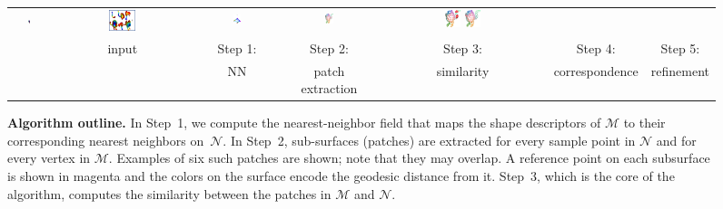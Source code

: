 \begin{figure}[htb]
\begin{tabular}{ccccccc}
		\includegraphics[width=0.08\textwidth]{figures/NNFin.png} &
		\includegraphics[width=0.2\textwidth]{figures/PartPatches.png} &
		\includegraphics[width=0.1\textwidth]{figures/DDISdown.png} &
		\includegraphics[width=0.1\textwidth]{figures/CorrsInit.png} &
		\includegraphics[width=0.1\textwidth]{figures/CorrsOutlier.png}
		\includegraphics[width=0.1\textwidth]{figures/CorrsRefine.png}\\
		&input &
		Step 1: &
		Step 2:  &
		Step 3:  &
		Step 4:  &
		Step 5: 
		\\
		& &
		 NN &
		 patch extraction &
		 similarity &
		 correspondence &
		 refinement
	\end{tabular}
	\caption{{\textbf {Algorithm outline.}}
    In Step~1, we compute the nearest-neighbor field that maps the shape descriptors of $\mathcal{M}$ to their corresponding nearest neighbors on~$\mathcal{N}$.
In Step~2, sub-surfaces (patches) are extracted for every sample point in $\mathcal{N}$ and for every vertex in $\mathcal{M}$.
Examples of six such patches are shown; note that they may overlap.
A reference point on each subsurface is shown in magenta and the colors on the surface encode the geodesic distance from it.
Step~3, which is the core of the algorithm, computes the similarity between the patches in $\mathcal{M}$ and $\mathcal{N}$.
}
\end{figure}
